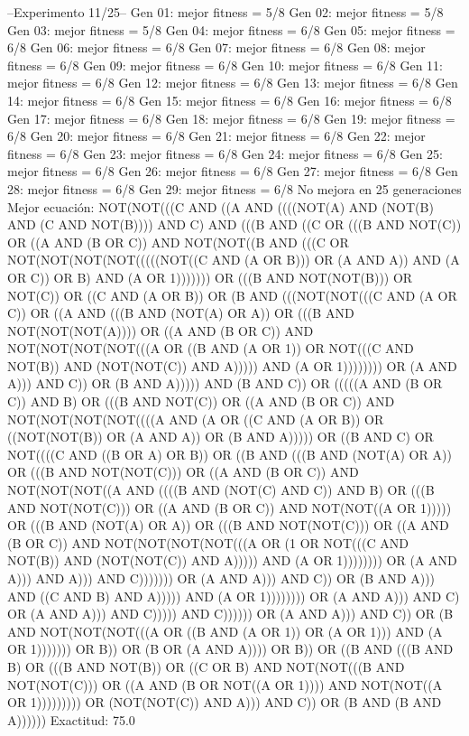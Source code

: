 --Experimento 
 11/25--
Gen 01: mejor fitness = 5/8
Gen 02: mejor fitness = 5/8
Gen 03: mejor fitness = 5/8
Gen 04: mejor fitness = 6/8
Gen 05: mejor fitness = 6/8
Gen 06: mejor fitness = 6/8
Gen 07: mejor fitness = 6/8
Gen 08: mejor fitness = 6/8
Gen 09: mejor fitness = 6/8
Gen 10: mejor fitness = 6/8
Gen 11: mejor fitness = 6/8
Gen 12: mejor fitness = 6/8
Gen 13: mejor fitness = 6/8
Gen 14: mejor fitness = 6/8
Gen 15: mejor fitness = 6/8
Gen 16: mejor fitness = 6/8
Gen 17: mejor fitness = 6/8
Gen 18: mejor fitness = 6/8
Gen 19: mejor fitness = 6/8
Gen 20: mejor fitness = 6/8
Gen 21: mejor fitness = 6/8
Gen 22: mejor fitness = 6/8
Gen 23: mejor fitness = 6/8
Gen 24: mejor fitness = 6/8
Gen 25: mejor fitness = 6/8
Gen 26: mejor fitness = 6/8
Gen 27: mejor fitness = 6/8
Gen 28: mejor fitness = 6/8
Gen 29: mejor fitness = 6/8
No mejora en 25 generaciones
Mejor ecuación: NOT(NOT(((C AND ((A AND ((((NOT(A) AND (NOT(B) AND (C AND NOT(B)))) AND C) AND (((B AND ((C OR (((B AND NOT(C)) OR ((A AND (B OR C)) AND NOT(NOT((B AND (((C OR NOT(NOT(NOT(NOT(((((NOT((C AND (A OR B))) OR (A AND A)) AND (A OR C)) OR B) AND (A OR 1))))))) OR (((B AND NOT(NOT(B))) OR NOT(C)) OR ((C AND (A OR B)) OR (B AND (((NOT(NOT(((C AND (A OR C)) OR ((A AND (((B AND (NOT(A) OR A)) OR (((B AND NOT(NOT(NOT(A)))) OR ((A AND (B OR C)) AND NOT(NOT(NOT(NOT(((A OR ((B AND (A OR 1)) OR NOT(((C AND NOT(B)) AND (NOT(NOT(C)) AND A))))) AND (A OR 1)))))))) OR (A AND A))) AND C)) OR (B AND A))))) AND (B AND C)) OR (((((A AND (B OR C)) AND B) OR (((B AND NOT(C)) OR ((A AND (B OR C)) AND NOT(NOT(NOT(NOT((((A AND (A OR ((C AND (A OR B)) OR ((NOT(NOT(B)) OR (A AND A)) OR (B AND A))))) OR ((B AND C) OR NOT((((C AND ((B OR A) OR B)) OR ((B AND (((B AND (NOT(A) OR A)) OR (((B AND NOT(NOT(C))) OR ((A AND (B OR C)) AND NOT(NOT(NOT((A AND ((((B AND (NOT(C) AND C)) AND B) OR (((B AND NOT(NOT(C))) OR ((A AND (B OR C)) AND NOT(NOT((A OR 1))))) OR (((B AND (NOT(A) OR A)) OR (((B AND NOT(NOT(C))) OR ((A AND (B OR C)) AND NOT(NOT(NOT(NOT(((A OR (1 OR NOT(((C AND NOT(B)) AND (NOT(NOT(C)) AND A))))) AND (A OR 1)))))))) OR (A AND A))) AND A))) AND C))))))) OR (A AND A))) AND C)) OR (B AND A))) AND ((C AND B) AND A))))) AND (A OR 1)))))))) OR (A AND A))) AND C) OR (A AND A))) AND C))))) AND C)))))) OR (A AND A))) AND C)) OR (B AND NOT(NOT(NOT(((A OR ((B AND (A OR 1)) OR (A OR 1))) AND (A OR 1))))))) OR B)) OR (B OR (A AND A)))) OR B)) OR ((B AND (((B AND B) OR (((B AND NOT(B)) OR ((C OR B) AND NOT(NOT(((B AND NOT(NOT(C))) OR ((A AND (B OR NOT((A OR 1)))) AND NOT(NOT((A OR 1))))))))) OR (NOT(NOT(C)) AND A))) AND C)) OR (B AND (B AND A))))))
 Exactitud: 75.0%

